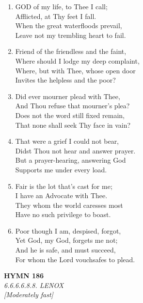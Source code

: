 \begin{enumerate}
    \item GOD of my life, to Thee I call; \\
        Afflicted, at Thy feet I fall. \\
        When the great waterfloods prevail, \\
        Leave not my trembling heart to fail.

    \item Friend of the friendless and the faint, \\
        Where should I lodge my deep complaint, \\
        Where, but with Thee, whose open door \\
        Invites the helpless and the poor?

    \item Did ever mourner plead with Thee, \\
        And Thou refuse that mourner's plea? \\
        Does not the word still fixed remain, \\
        That none shall seek Thy face in vain?

    \item That were a grief I could not bear, \\
        Didst Thou not hear and answer prayer. \\
        But a prayer-hearing, answering God \\
        Supports me under every load.

    \item Fair is the lot that's cast for me; \\
        I have an Advocate with Thee. \\
        They whom the world caresses most \\
        Have no such privilege to boast.

    \item Poor though I am, despised, forgot, \\
        Yet God, my God, forgets me not; \\
        And he is safe, and must succeed, \\
        For whom the Lord vouchsafes to plead.

\end{enumerate}

\newpage
\begin{center}
    {\Large \textbf{HYMN 186}}
    \\
    \textit{6.6.6.6.8.8. LENOX}
    \\
    \textit{\small [Moderately fast]}
\end{center}
\vspace{1em}

